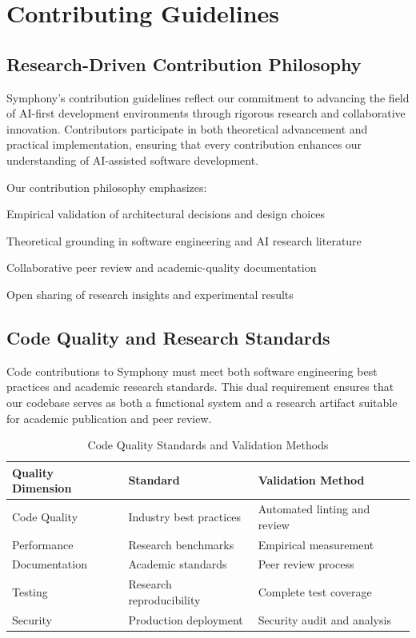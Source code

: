 \section*{Contributing Guidelines}

\subsection*{Research-Driven Contribution Philosophy}

Symphony's contribution guidelines reflect our commitment to advancing the field of AI-first development environments through rigorous research and collaborative innovation. Contributors participate in both theoretical advancement and practical implementation, ensuring that every contribution enhances our understanding of AI-assisted software development.

Our contribution philosophy emphasizes:
\begin{compactlist}
    \item Empirical validation of architectural decisions and design choices
    \item Theoretical grounding in software engineering and AI research literature
    \item Collaborative peer review and academic-quality documentation
    \item Open sharing of research insights and experimental results
\end{compactlist}

\subsection*{Code Quality and Research Standards}

Code contributions to Symphony must meet both software engineering best practices and academic research standards. This dual requirement ensures that our codebase serves as both a functional system and a research artifact suitable for academic publication and peer review.

\begin{table}[ht]
\centering
\begin{tabular}{@{}lll@{}}
\toprule
\textbf{Quality Dimension} & \textbf{Standard} & \textbf{Validation Method} \\
\midrule
Code Quality & Industry best practices & Automated linting and review \\
Performance & Research benchmarks & Empirical measurement \\
Documentation & Academic standards & Peer review process \\
Testing & Research reproducibility & Complete test coverage \\
Security & Production deployment & Security audit and analysis \\
\bottomrule
\end{tabular}
\caption{Code Quality Standards and Validation Methods}
\end{table}

